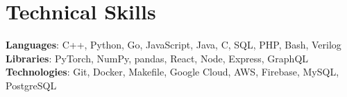 \section{Technical Skills}
 \begin{itemize}[leftmargin=0.15in, label={}]
    \small{\item{
     \textbf{Languages}{: C++, Python, Go, JavaScript, Java, C, SQL, PHP, Bash, Verilog} \\
     \textbf{Libraries}{: PyTorch, NumPy, pandas, React, Node, Express, GraphQL} \\
     \textbf{Technologies}{: Git, Docker, Makefile, Google Cloud, AWS, Firebase, MySQL, PostgreSQL}
    }}
 \end{itemize}
